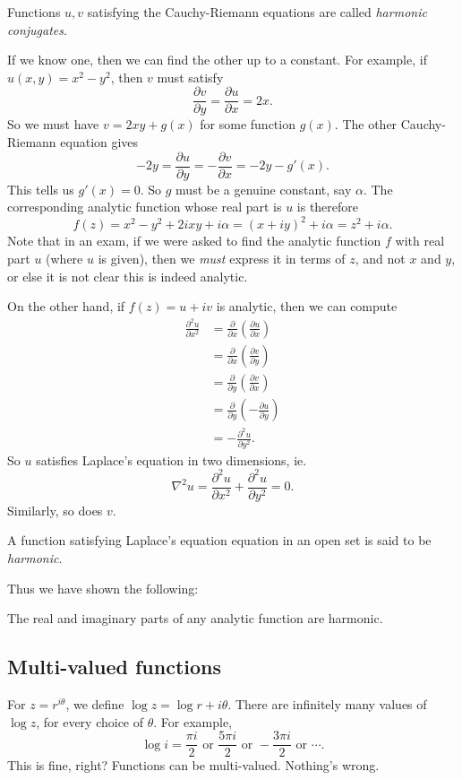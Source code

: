 \documentclass[a4paper]{article}
\begin{document}
\begin{defi}
  Functions $u, v$ satisfying the Cauchy-Riemann equations are called \emph{harmonic conjugates}.
\end{defi}

If we know one, then we can find the other up to a constant. For example, if $u(x, y) = x^2 - y^2$, then $v$ must satisfy
\[
  \frac{\partial v}{\partial y} = \frac{\partial u}{\partial x} = 2x.
\]
So we must have $v = 2xy + g(x)$ for some function $g(x)$. The other Cauchy-Riemann equation gives
\[
  -2y = \frac{\partial u}{\partial y} = -\frac{\partial v}{\partial x} = -2y - g'(x).
\]
This tells us $g'(x) = 0$. So $g$ must be a genuine constant, say $\alpha$. The corresponding analytic function whose real part is $u$ is therefore
\[
  f(z) = x^2 - y^2 + 2ixy + i\alpha = (x + iy)^2 + i \alpha = z^2 + i\alpha.
\]
Note that in an exam, if we were asked to find the analytic function $f$ with real part $u$ (where $u$ is given), then we \emph{must} express it in terms of $z$, and not $x$ and $y$, or else it is not clear this is indeed analytic.

On the other hand, if $f(z) = u + iv$ is analytic, then we can compute
\begin{align*}
  \frac{\partial^2 u}{\partial x^2} &= \frac{\partial }{\partial x}\left(\frac{\partial u}{\partial x}\right)\\
  &= \frac{\partial }{\partial x} \left(\frac{\partial v}{\partial y}\right)\\
  &= \frac{\partial }{\partial y}\left(\frac{\partial v}{\partial x}\right)\\
  &= \frac{\partial }{\partial y}\left(- \frac{\partial u}{\partial y}\right)\\
  &= -\frac{\partial^2 u}{\partial y^2}.
\end{align*}
So $u$ satisfies Laplace's equation in two dimensions, ie.
\[
  \nabla^2 u = \frac{\partial^2 u}{\partial x^2} + \frac{\partial^2 u}{\partial y^2} = 0.
\]
Similarly, so does $v$.
\begin{defi}
  A function satisfying Laplace's equation equation in an open set is said to be \emph{harmonic}.
\end{defi}

Thus we have shown the following:
\begin{prop}
  The real and imaginary parts of any analytic function are harmonic.
\end{prop}

\subsection{Multi-valued functions}
For $z = r^{i\theta}$, we define $\log z = \log r + i \theta$. There are infinitely many values of $\log z$, for every choice of $\theta$. For example,
\[
  \log i = \frac{\pi i}{2} \text{ or }\frac{5\pi i}{2}\text{ or } -\frac{3\pi i}{2}\text{ or }\cdots.
\]
This is fine, right? Functions can be multi-valued. Nothing's wrong.
\end{document}
